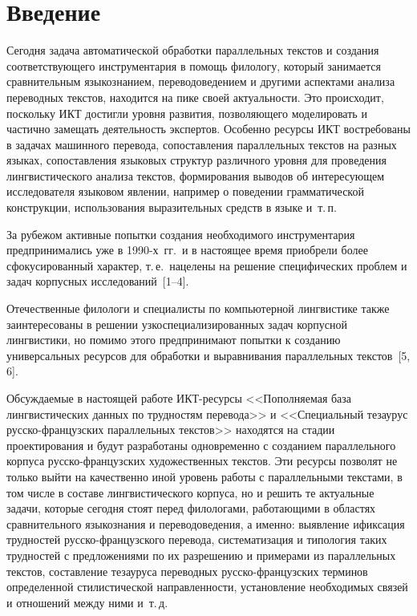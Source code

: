       \begin{multicols}{2}

            \label{st\stat}

\section{Введение}

     Сегодня задача автоматической обработки параллельных текстов и 
создания соответствующего инструментария в помощь филологу, который 
занимается сравнительным языкознанием, переводоведением и другими 
аспектами анализа переводных текстов, находится на пике своей 
актуальности. Это происходит, поскольку 
ИКТ достигли уровня развития, позволяющего моделировать и частично замещать 
деятельность экспертов. Особенно ресурсы ИКТ востребованы в задачах 
машинного перевода, сопоставления параллельных текстов на разных 
языках, сопоставления языковых структур различного уровня для проведения 
лингвистического анализа текстов, формирования выводов об интересующем 
исследователя языковом явлении, например о поведении грамматической 
конструкции, использования выразительных средств в языке и~т.\,п.
     
     За рубежом активные попытки создания необходимого инструментария 
предпринимались уже в 1990-х~гг.\ и в настоящее время 
приобрели более сфокусированный характер, т.\,е.\ нацелены на решение 
специфических проблем и задач корпусных исследований~[1--4]. 

Отечественные филологи и специалисты по компьютерной лингвистике 
также заинтересованы в решении узкоспециализированных задач корпусной 
лингвистики, но помимо этого предпринимают попытки к созданию 
универсальных ресурсов для обработки и выравнивания параллельных 
текстов~[5, 6].
     
     Обсуждаемые в настоящей работе ИКТ-ре\-сур\-сы <<Пополняемая 
база лингвистических данных по трудностям перевода>> и <<Специальный 
тезаурус рус\-ско-фран\-цуз\-ских параллельных текстов>> находятся на 
стадии проектирования и будут разработаны одновременно с созданием 
параллельного корпуса рус\-ско-фран\-цуз\-ских художественных текстов. 
Эти ресурсы позволят не только выйти на качественно иной уровень работы 
с параллельными текстами, в том числе в составе лингвистического корпуса, 
но и решить те актуальные задачи, которые сегодня стоят перед филологами, 
работающими в областях сравнительного языкознания и переводоведения, а 
именно: выявление и\linebreak фикса\-ция трудностей рус\-ско-фран\-цуз\-ско\-го 
перевода, сис\-тематизация и типология таких трудностей с пред\-ложениями по 
их разрешению и примерами из параллель\-ных текстов, составление тезауруса 
переводных рус\-ско-фран\-цуз\-ских терминов определенной 
стилистической направленности, установ\-ле\-ние необходимых связей и 
отношений между ними и~т.\,д.
     

\end{multicols}
